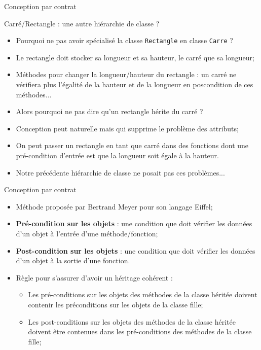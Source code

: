 \documentclass[handout,10pt]{beamer}
\begin{document}
\begin{frame}[fragile]{Conception par contrat}
\tiny
\begin{block}{Carré/Rectangle : une autre hiérarchie de classe ?}
\begin{itemize}
\item Pourquoi ne pas avoir spécialisé la classe \lstinline$Rectangle$ en classe \lstinline$Carre$ ?
\item Le rectangle doit stocker sa longueur et sa hauteur, le carré que sa longueur;
\item Méthodes pour changer la longueur/hauteur du rectangle : un carré ne vérifiera plus l'égalité de la hauteur et de la longueur en poscondition de ces méthodes...
\item Alors pourquoi ne pas dire qu'un rectangle hérite du carré ?
\item Conception peut naturelle mais qui supprime le problème des attributs;
\item On peut passer un rectangle en tant que carré dans des fonctions dont une pré-condition d'entrée est que la longueur soit égale à la hauteur.
\item Notre précédente hiérarchie de classe ne posait pas ces problèmes...
\end{itemize}
\end{block}

\begin{block}{Conception par contrat}
\begin{itemize}
\item Méthode proposée par Bertrand Meyer pour son langage Eiffel;
\item \textbf{Pré-condition sur les objets} : une condition que doit vérifier les données d'un objet à l'entrée d'une méthode/fonction;
\item \textbf{Post-condition sur les objets} : une condition que doit vérifier les données d'un objet à la sortie d'une fonction.
\item {\color{blue}Règle pour s'assurer d'avoir un héritage cohérent} : 
\begin{itemize}
\item Les pré-conditions sur les objets des méthodes de la classe héritée doivent contenir les préconditions sur les objets de la classe fille;
\item Les post-conditions sur les objets des méthodes de la classe héritée doivent être contenues dans les pré-conditions des méthodes de la classe fille;
\end{itemize}
\end{itemize}
\end{block}
\end{frame}
\end{document}
